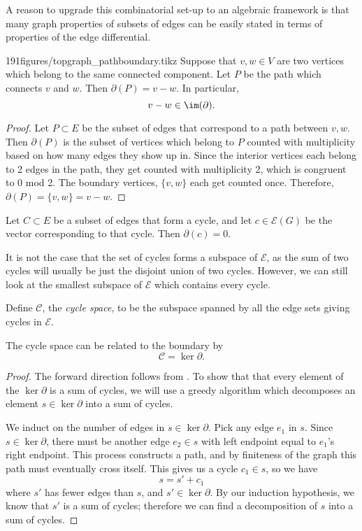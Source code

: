 A reason to upgrade this combinatorial set-up to an algebraic framework is that many graph properties of subsets of edges can be easily stated in terms of properties of the edge differential. 
\begin{claimfigureenv}{191figures/topgraph_pathboundary.tikz}
	Suppose that $v, w\in V$ are two vertices which belong to the same connected component.
	Let $P$ be the path which connects $v$ and $w$. Then $\partial(P)=v-w$. 
	In particular, 
	\[v-w\in \im (\partial).\] 
	\label{claim:pathsindifferential}
\end{claimfigureenv}

\begin{proof}
	Let $P\subset E$ be the subset of edges that correspond to a path between $v, w$. Then $\partial(P)$ is the subset of vertices which belong to $P$ counted with multiplicity based on how many edges they show up in. Since the interior vertices each belong to 2 edges in the path, they get counted with multiplicity 2, which is congruent to 0 mod 2. The boundary vertices, $\{v, w\}$ each get counted once. Therefore, $\partial(P)=\{v, w\}= v-w$. 
\end{proof}
\begin{corollary}
Let $C\subset E$ be a subset of edges that form a cycle, and let $c\in \mathcal E(G)$ be the vector corresponding to that cycle. Then $\partial(c)=0$. 
\end{corollary}
It is not the case that the set of cycles forms a subspace of $\mathcal E$, as the sum of two cycles will usually be just the disjoint union of two cycles. However, we can still look at the smallest subspace of $\mathcal E$ which contains every cycle. 
\begin{definition} Define $\mathcal C$, the \emph{cycle space}, to be the subspace spanned by all the edge sets giving cycles in $\mathcal E$.
\end{definition} 
\begin{claim}
The cycle space can be related to the boundary by 
\[\mathcal C = \ker \partial.\]
\label{claim:cyclespaceisker}
\end{claim}
\begin{proof}
The forward direction follows from . To show that that every element of the $\ker\partial$ is a sum of cycles, we will use a greedy algorithm which decomposes an element $s\in \ker \partial $ into a sum of cycles.

We induct on the number of edges in  $s\in \ker \partial$. Pick any edge $e_1$ in $s$. Since $s\in \ker \partial$, there must be another edge $e_2\in s$ with left endpoint equal to $e_1$'s right endpoint. This process constructs a path, and by finiteness of the graph this path must eventually cross itself. This gives us a cycle $c_1\in s$, so we have 
\[s=s'+c_1\]
where $s'$ has fewer edges than $s$, and $s'\in \ker \partial$. By our induction hypothesis, we know that $s'$ is a sum of cycles; therefore we can find a decomposition of $s$ into a sum of cycles. 
\end{proof}
